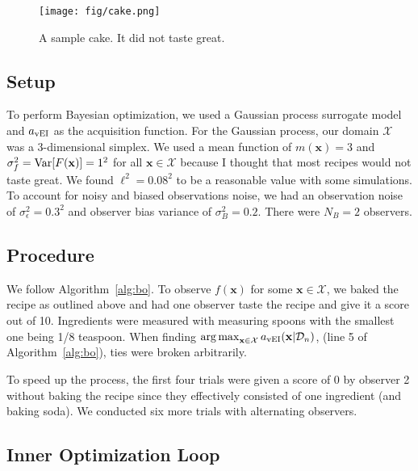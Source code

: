 \begin{figure}
    \centering
    \texttt{[image: fig/cake.png]}
    \caption{A sample cake. It did not taste great.}
    \label{fig:cake}
\end{figure}

\subsection{Setup}\label{ssec:setup}

To perform Bayesian optimization, we used a Gaussian process surrogate model and $a_{\mathrm{vEI}}$ as the acquisition function.
For the Gaussian process, our domain $\mathcal{X}$ was a 3-dimensional simplex.
We used a mean function of $m(\mathbf{x}) = 3$ and $\sigma^2_f = \operatorname{Var}[F(\mathbf{x})] = 1 ^ 2$ for all $\mathbf{x} \in \mathcal{X}$ because
I thought that most recipes would not taste great.
We found $\ell^2 = 0.08^2$ to be a reasonable value with some simulations.
To account for noisy and biased observations noise, we had an observation noise of $\sigma^2_{\epsilon} = 0.3 ^ 2$ and observer bias variance of $\sigma_B^2 = 0.2$.
There were $N_B = 2$ observers.

\subsection{Procedure}\label{ssec:procedure}

We follow Algorithm~\ref{alg:bo}.
To observe $f(\mathbf{x})$ for some $\mathbf{x} \in \mathcal{X}$, we baked the recipe as outlined above and had one observer taste the recipe and give it a score out of 10.
Ingredients were measured with measuring spoons with the smallest one being 1/8 teaspoon.
When finding $\operatorname*{arg\,max}_{\mathbf{x} \in \mathcal{X} } a_{\mathrm{vEI}}( \mathbf{x} | \mathcal{D}_n)$, (line 5 of Algorithm~\ref{alg:bo}), ties were broken arbitrarily.

To speed up the process, the first four trials were given a score of 0 by observer 2 without baking the recipe since they effectively consisted of one ingredient (and baking soda).
We conducted six more trials with alternating observers.

\subsection{Inner Optimization Loop}\label{ssec:inner-opt}

